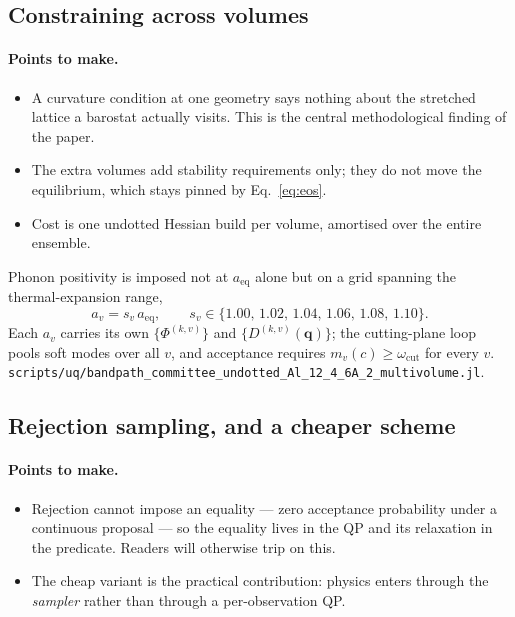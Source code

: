 \documentclass{article}
\newcommand{\code}[1]{\texttt{\small #1}}
\begin{document}
\subsection{Constraining across volumes}
\label{sec:multivolume}

\paragraph{Points to make.}
\begin{itemize}
  \item A curvature condition at one geometry says nothing about the stretched lattice a barostat actually visits. This is the central methodological finding of the paper.
  \item The extra volumes add stability requirements only; they do not move the equilibrium, which stays pinned by Eq.~\eqref{eq:eos}.
  \item Cost is one undotted Hessian build per volume, amortised over the entire ensemble.
\end{itemize}

Phonon positivity is imposed not at $a_{\mathrm{eq}}$ alone but on a grid
spanning the thermal-expansion range,
\begin{equation}
  a_v = s_v\,a_{\mathrm{eq}},
  \qquad s_v \in \{1.00,\,1.02,\,1.04,\,1.06,\,1.08,\,1.10\}.
  \label{eq:volgrid}
\end{equation}
Each $a_v$ carries its own $\{\Phi^{(k,v)}\}$ and $\{D^{(k,v)}(\bm q)\}$; the
cutting-plane loop pools soft modes over all $v$, and acceptance requires
$m_v(c) \ge \omega_{\mathrm{cut}}$ for every $v$.
\code{scripts/uq/bandpath\_committee\_undotted\_Al\_12\_4\_6A\_2\_multivolume.jl}.

\subsection{Rejection sampling, and a cheaper scheme}
\label{sec:cheap}

\paragraph{Points to make.}
\begin{itemize}
  \item Rejection cannot impose an equality --- zero acceptance probability under a continuous proposal --- so the equality lives in the QP and its relaxation in the predicate. Readers will otherwise trip on this.
  \item The cheap variant is the practical contribution: physics enters through the \emph{sampler} rather than through a per-observation QP.
\end{itemize}
\end{document}
